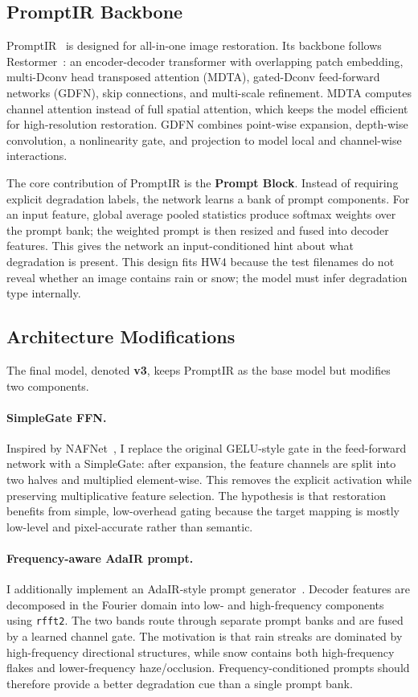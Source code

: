 \documentclass[10pt,twocolumn,letterpaper]{article}
\begin{document}
\subsection{PromptIR Backbone}
PromptIR~\cite{potlapalli2023promptir} is designed for all-in-one image restoration. Its backbone follows Restormer~\cite{zamir2022restormer}: an encoder-decoder transformer with overlapping patch embedding, multi-Dconv head transposed attention (MDTA), gated-Dconv feed-forward networks (GDFN), skip connections, and multi-scale refinement. MDTA computes channel attention instead of full spatial attention, which keeps the model efficient for high-resolution restoration. GDFN combines point-wise expansion, depth-wise convolution, a nonlinearity gate, and projection to model local and channel-wise interactions.

The core contribution of PromptIR is the \textbf{Prompt Block}. Instead of requiring explicit degradation labels, the network learns a bank of prompt components. For an input feature, global average pooled statistics produce softmax weights over the prompt bank; the weighted prompt is then resized and fused into decoder features. This gives the network an input-conditioned hint about what degradation is present. This design fits HW4 because the test filenames do not reveal whether an image contains rain or snow; the model must infer degradation type internally.

\subsection{Architecture Modifications}
The final model, denoted \textbf{v3}, keeps PromptIR as the base model but modifies two components.

\paragraph{SimpleGate FFN.} Inspired by NAFNet~\cite{chen2022nafnet}, I replace the original GELU-style gate in the feed-forward network with a SimpleGate: after expansion, the feature channels are split into two halves and multiplied element-wise. This removes the explicit activation while preserving multiplicative feature selection. The hypothesis is that restoration benefits from simple, low-overhead gating because the target mapping is mostly low-level and pixel-accurate rather than semantic.

\paragraph{Frequency-aware AdaIR prompt.} I additionally implement an AdaIR-style prompt generator~\cite{cui2024adair}. Decoder features are decomposed in the Fourier domain into low- and high-frequency components using \texttt{rfft2}. The two bands route through separate prompt banks and are fused by a learned channel gate. The motivation is that rain streaks are dominated by high-frequency directional structures, while snow contains both high-frequency flakes and lower-frequency haze/occlusion. Frequency-conditioned prompts should therefore provide a better degradation cue than a single prompt bank.
\end{document}
